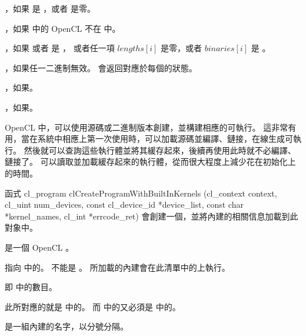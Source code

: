 \item {}，如果  是 ，或者  是零。

\item {}，如果  中的 OpenCL  不在  中。

\item {}，如果  或者  是 ，
或者任一項 $lengths[i]$ 是零，或者 $binaries[i]$ 是 。

\item {}，如果任一二進制無效。  會返回對應於每個的狀態。

\item {}，如果\scdevfailres。

\item {}，如果\schostfailres。
\stopigBase

OpenCL 中，可以使用源碼或二進制版本創建，並構建相應的可執行。
這非常有用，當在系統中相應上第一次使用時，可以加載源碼並編譯、鏈接，在線生成可執行。
然後就可以查詢這些執行體並將其緩存起來，後續再使用此時就不必編譯、鏈接了。
可以讀取並加載緩存起來的執行體，從而很大程度上減少花在初始化上的時間。

函式
\startclc
cl_program clCreateProgramWithBuiltInKernels (cl_context context,
			cl_uint num_devices,
			const cl_device_id *device_list,
			const char *kernel_names,
			cl_int *errcode_ret)
\stopclc
會創建一個，並將內建的相關信息加載到此對象中。

 是一個 OpenCL 。

 指向  中的。
 不能是 。
所加載的內建會在此清單中的上執行。

 即  中的數目。

此所對應的就是  中的。
而  中的又必須是  中的。

 是一組內建的名字，以分號分隔。

